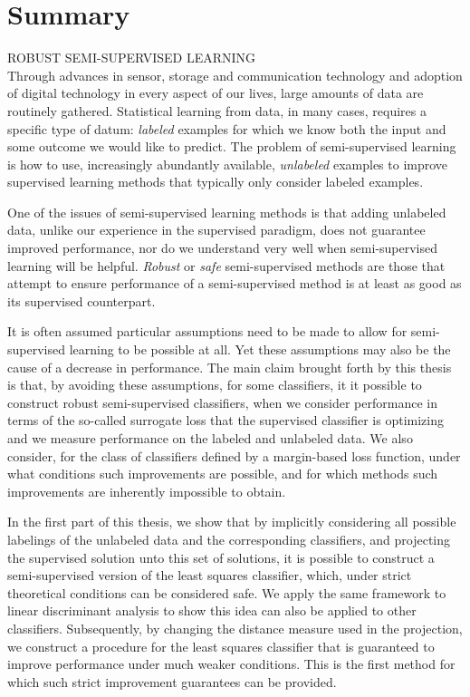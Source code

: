 \chapter{Summary}
{\LARGE{\textsf{\MakeUppercase{Robust Semi-supervised Learning}}}}
\\[12pt]
Through advances in sensor, storage and communication technology and adoption of digital technology in every aspect of our lives, large amounts of data are routinely gathered. Statistical learning from data, in many cases, requires a specific type of datum: \emph{labeled} examples for which we know both the input and some outcome we would like to predict. The problem of semi-supervised learning is how to use, increasingly abundantly available, \emph{unlabeled} examples to improve supervised learning methods that typically only consider labeled examples.

One of the issues of semi-supervised learning methods is that adding unlabeled data, unlike our experience in the supervised paradigm, does not guarantee improved performance, nor do we understand very well when semi-supervised learning will be helpful. \emph{Robust} or \emph{safe} semi-supervised methods are those that attempt to ensure performance of a semi-supervised method is at least as good as its supervised counterpart. 

It is often assumed particular assumptions need to be made to allow for semi-supervised learning to be possible at all. Yet these assumptions may also be the cause of a decrease in performance. The main claim brought forth by this thesis is that, by avoiding these assumptions, for some classifiers, it it possible to construct robust semi-supervised classifiers, when we consider performance in terms of the so-called surrogate loss that the supervised classifier is optimizing and we measure performance on the labeled and unlabeled data. We also consider, for the class of classifiers defined by a margin-based loss function, under what conditions such improvements are possible, and for which methods such improvements are inherently impossible to obtain.

In the first part of this thesis, we show that by implicitly considering all possible labelings of the unlabeled data and the corresponding classifiers, and projecting the supervised solution unto this set of solutions, it is possible to construct a semi-supervised version of the least squares classifier, which, under strict theoretical conditions can be considered safe. We apply the same framework to linear discriminant analysis to show this idea can also be applied to other classifiers. Subsequently, by changing the distance measure used in the projection, we construct a procedure for the least squares classifier that is guaranteed to improve performance under much weaker conditions. This is the first method for which such strict improvement guarantees can be provided.

